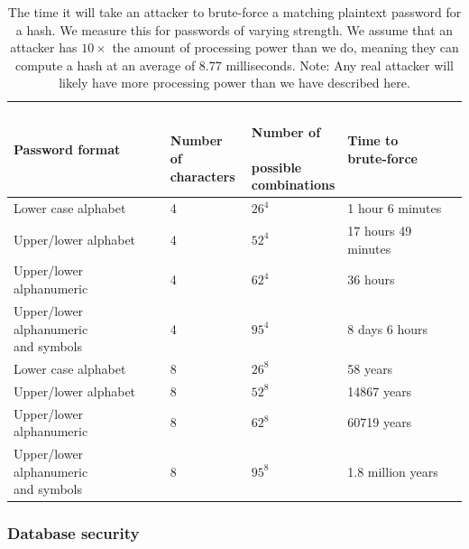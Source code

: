 \documentclass[12pt, titlepage]{article}
\begin{document}
\begin{center}
\begin{table}[h!]
    \begin{tabular}{ | l | l | l | l |}
    \hline
    \textbf{Password format} & \shortstack{\\ \textbf{Number of} \\ \textbf{characters}} & \shortstack{\\ \textbf{Number of} \\ \\ \textbf{possible} \\ \textbf{combinations}} & \shortstack{\textbf{Time to} \\ \textbf{brute-force}} \\ \hline
    Lower case alphabet  & 4 & $26^4$ & 1 hour 6 minutes \\ \hline
    Upper/lower alphabet  & 4 & $52^4$ & 17 hours 49 minutes \\ \hline
    Upper/lower alphanumeric & 4 & $62^4$ & 36 hours \\ \hline
    \shortstack{Upper/lower alphanumeric \\ and symbols}  & 4 & $95^4$ & 8 days 6 hours \\ \hline
    Lower case alphabet  & 8 & $26^8$ & 58 years \\ \hline
    Upper/lower alphabet  & 8 & $52^8$ & 14867 years \\ \hline
    Upper/lower alphanumeric & 8 & $62^8$ & 60719 years \\ \hline
    \shortstack{Upper/lower alphanumeric \\ and symbols}  & 8 & $95^8$ & 1.8 million years \\ \hline
    
    \end{tabular}
    \caption{The time it will take an attacker to brute-force a matching plaintext password for a hash. We measure this for passwords of varying strength. We assume that an attacker has $10 \times$ the amount of processing power than we do, meaning they can compute a hash at an average of 8.77 milliseconds.
    \newline Note: Any real attacker will likely have more processing power than we have described here.} \label{tab:passwordbruteforce}
    \end{table}
\end{center}

\subsubsection*{Database security}
\end{document}
